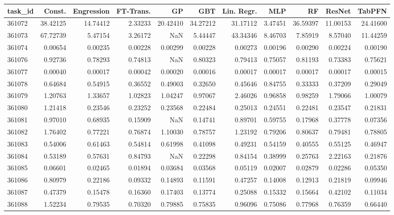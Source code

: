 \begin{tabular}{lrrrrrrrrrr}
\toprule
task\_id & Const. & Engression & FT-Trans. & GP & GBT & Lin. Regr. & MLP & RF & ResNet & TabPFN \\
\midrule
361072 & 38.42125 & 14.74412 & 2.33233 & 20.42410 & 34.27212 & 31.17112 & 3.47451 & 36.59397 & 11.00153 & 24.41600 \\
361073 & 67.72739 & 5.47154 & 3.26172 & NaN & 5.44447 & 43.34346 & 8.46703 & 7.85919 & 8.57040 & 11.44259 \\
361074 & 0.00654 & 0.00235 & 0.00228 & 0.00299 & 0.00228 & 0.00273 & 0.00196 & 0.00290 & 0.00224 & 0.00190 \\
361076 & 0.92736 & 0.78293 & 0.74813 & NaN & 0.80323 & 0.79413 & 0.75057 & 0.81193 & 0.73383 & 0.75621 \\
361077 & 0.00040 & 0.00017 & 0.00042 & 0.00020 & 0.00016 & 0.00017 & 0.00017 & 0.00017 & 0.00017 & 0.00015 \\
361078 & 0.64684 & 0.54915 & 0.36552 & 0.49003 & 0.32650 & 0.45646 & 0.84755 & 0.33333 & 0.37209 & 0.29049 \\
361079 & 1.20763 & 1.33657 & 1.02823 & 1.04247 & 0.97067 & 2.46026 & 0.96858 & 0.98259 & 1.79066 & 1.00079 \\
361080 & 1.21418 & 0.23546 & 0.23252 & 0.23568 & 0.22484 & 0.25013 & 0.24551 & 0.22481 & 0.23547 & 0.21831 \\
361081 & 0.97010 & 0.68935 & 0.15909 & NaN & 0.14741 & 0.89701 & 0.59755 & 0.17968 & 0.37778 & 0.07356 \\
361082 & 1.76402 & 0.77221 & 0.76874 & 1.10030 & 0.78757 & 1.23192 & 0.79206 & 0.80637 & 0.79481 & 0.78805 \\
361083 & 0.54006 & 0.61463 & 0.54814 & 0.61998 & 0.41098 & 0.49231 & 0.54159 & 0.40555 & 0.55125 & 0.46947 \\
361084 & 0.53189 & 0.57631 & 0.84793 & NaN & 0.22298 & 0.84154 & 0.38999 & 0.25763 & 2.22163 & 0.21876 \\
361085 & 0.06601 & 0.02465 & 0.01894 & 0.03684 & 0.03568 & 0.05119 & 0.02007 & 0.02879 & 0.02286 & 0.05350 \\
361086 & 0.80979 & 0.22186 & 0.09332 & 0.14893 & 0.11591 & 0.47257 & 0.14008 & 0.12913 & 0.21819 & 0.09946 \\
361087 & 0.47379 & 0.15478 & 0.16360 & 0.17403 & 0.13774 & 0.25088 & 0.15332 & 0.15664 & 0.42102 & 0.11034 \\
361088 & 1.52234 & 0.79535 & 0.70320 & 0.79885 & 0.75835 & 0.96096 & 0.75086 & 0.77968 & 0.76359 & 0.66440 \\

\end{tabular}
